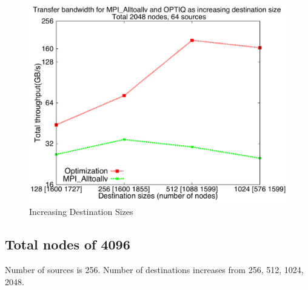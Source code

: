 \documentclass[letter]{article}
\begin{document}
\begin{figure}[h]
\vspace{-0.1in}
\centering
\includegraphics[scale=0.40]{report_figures/incrsize/incrsize_2k.pdf}
\vspace{-0.1in}
\caption{Increasing Destination Sizes}
\vspace{-0.1in}
\label{fig:incrsize_2k}
\end{figure}

\clearpage
\newpage





\clearpage
\newpage

\subsection{Total nodes of 4096}

Number of sources is 256. Number of destinations increases from 256, 512, 1024, 2048.
\end{document}
